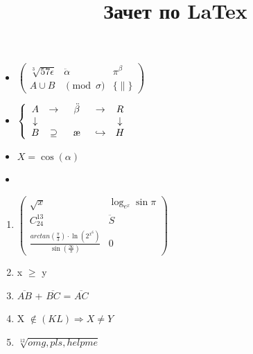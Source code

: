 \documentclass[a4paper, 12pt]{article}
\title{Зачет по LaTex}
\date{}
\begin{document}
\maketitle{}
\begin{itemize}
	\item
	$\left(
	\begin{array}{ccccc}
		\sqrt[3]{57\epsilon}&\ddot{\alpha}&\pi^{\beta}\\
		A\cup B&\pmod{\sigma}&\{\parallel\}
	\end{array}
	\right)$
	\phantom{S}
	\item
	$\left\{
	\begin{array}{ccccccccc}
		A&\to&\ddot{\beta}&\to&R\\
		\downarrow&&\phantom{text}&&\downarrow\\
		B&\supseteq&\j&\hookrightarrow&H
	\end{array}
	\right.$
	\item
	$X = \cos(\alpha)$
	\item
	\newpage
\end{itemize}
	
\begin{enumerate}
	\item
	$\left(
	\begin{array}{ccc}
		\sqrt{x}&\log_{e^x}\sin\pi\\
		C^{13}_{24}&\ddot{S}\\
		\frac{arctan(\frac{\pi}{3})\cdot\ln(2^{x^6})}{\sin(\frac{\infty}{\pi})}&0
	\end{array}
	\right)$
	\item
	x $\ge$ y
	\item
	$\overline{AB}$ + $\overline{BC}$ = $\overline{AC}$
	\item
	X $\not\in (KL) \Rightarrow X \ne Y$
	\item
	$\sqrt[12]{omg, pls, help me} $
	
	
\end{enumerate}
\end{document}
